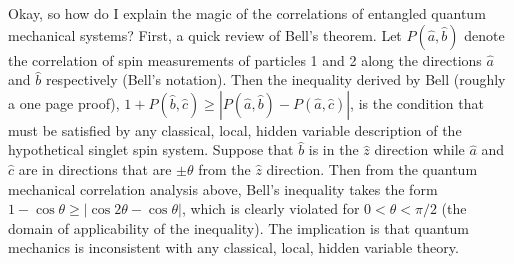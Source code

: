 \documentclass[12pt]{article}
\begin{document}
Okay, so how do I explain the magic of the correlations of entangled quantum mechanical systems?  First, a quick review of Bell's theorem.  Let $P(\hat{a},\hat{b})$ denote the correlation of spin measurements of particles 1 and 2 along the directions $\hat{a}$ and $\hat{b}$ respectively (Bell's notation).  Then the inequality derived by Bell (roughly a one page proof), $1+P(\hat{b},\hat{c}) \geq |P(\hat{a},\hat{b})-P(\hat{a},\hat{c})|$, is the condition that must be satisfied by any classical, local, hidden variable description of the hypothetical singlet spin system.  Suppose that $\hat{b}$ is in the $\hat{z}$ direction while $\hat{a}$ and $\hat{c}$ are in directions that are $\pm \theta$ from the $\hat{z}$ direction.  Then from the quantum mechanical correlation analysis above, Bell's inequality takes the form $1-\cos{\theta}\ge |\cos 2\theta - \cos \theta |$, which is clearly violated for $0 < \theta < \pi/2$ (the domain of applicability of the inequality).  The implication is that quantum mechanics is inconsistent with any classical, local, hidden variable theory.
\end{document}
